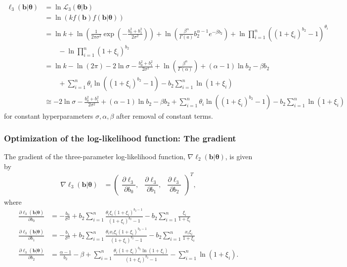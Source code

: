 \documentclass[11pt, letterpaper]{article}
\newcommand{\mc}[1]{\mathcal{#1}}
\numberwithin{equation}{section}
\begin{document}
\begin{align*}
\ell_3(\bm b | \bm \theta) &= \ln \mc L_3(\bm \theta | \bm b) \\
&= \ln( kf(\bm b)f(\bm b | \bm \theta)) \\
&=\ln k + \ln \left(\frac{1}{2\pi \sigma^2} \exp \left(-\frac{b_0^2 + b_1^2}{2\sigma^2} \right) \right) + \ln \left(\frac{\beta^\alpha}{\Gamma(a)} b_2^{\alpha-1}e^{-\beta b_2}\right) + \ln\prod_{i=1}^n \left( (1+\xi_i)^{b_2}-1 \right)^{\theta_i} \\
&\qquad - \ln \prod_{i=1}^n (1+\xi_i)^{b_2} \\
&= \ln k - \ln(2\pi) - 2 \ln \sigma - \frac{b_0^2 + b_1^2}{2\sigma^2} + \ln \left( \frac{\beta^\alpha}{\Gamma(\alpha)} \right) + (\alpha-1)\ln b_2 -\beta b_2 \\
&\qquad + \sum_{i=1}^n \theta_i \ln \left((1+\xi_i)^{b_2}-1\right) - b_2\sum_{i=1}^n  \ln (1+\xi_i) \\
&\cong - 2 \ln \sigma - \frac{b_0^2 + b_1^2}{2\sigma^2} + (\alpha-1)\ln b_2 -\beta b_2  + \sum_{i=1}^n \theta_i \ln \left((1+\xi_i)^{b_2}-1\right) - b_2\sum_{i=1}^n  \ln (1+\xi_i)
\end{align*}
for constant hyperparameters $\sigma, \alpha, \beta$ after removal of constant terms.

\subsubsection{Optimization of the log-likelihood function: The gradient}
The gradient of the three-parameter log-likelihood function, $\nabla \ell_2(\bm b | \bm \theta)$, is given by
\begin{align*}
\nabla \ell_3(\bm b | \bm \theta) &= \begin{pmatrix}
\dfrac{\partial \ell_3}{\partial b_0},   & \dfrac{\partial \ell_3}{\partial b_1} , & \dfrac{\partial \ell_3}{\partial b_2} 
\end{pmatrix}^T,
\end{align*}
where 
\begin{align*}
\frac{\partial \ell_3 (\bm b | \bm \theta)}{\partial b_0}   &= -\frac{b_0}{\sigma^2} + b_2 \sum_{i=1}^n \frac{\theta_i \xi_i\left(1+\xi_i \right)^{b_2-1}}{(1+\xi_i)^{b_2} - 1} - b_2 \sum_{i=1}^n \frac{\xi_i}{1+ \xi_i} \\
\frac{\partial \ell_3 (\bm b | \bm \theta)}{\partial b_1}   &= -\frac{b_1}{\sigma^2} + b_2 \sum_{i=1}^n \frac{\theta_i x_i \xi_i\left(1+ \xi_i\right)^{b_2-1}}{(1+\xi_i)^{b_2} - 1} - b_2 \sum_{i=1}^n \frac{x_i \xi_i}{1+\xi_i} \\
\frac{\partial \ell_3 (\bm b | \bm \theta)}{\partial b_2}   &= \frac{\alpha -1}{b_2} - \beta + \sum_{i=1}^n \frac{\theta_i (1+\xi_i)^{b_2}\ln(1+\xi_i)}{(1+\xi_i)^{b_2}-1}  -\sum_{i=1}^n  \ln (1+\xi_i).
\end{align*}
\end{document}
